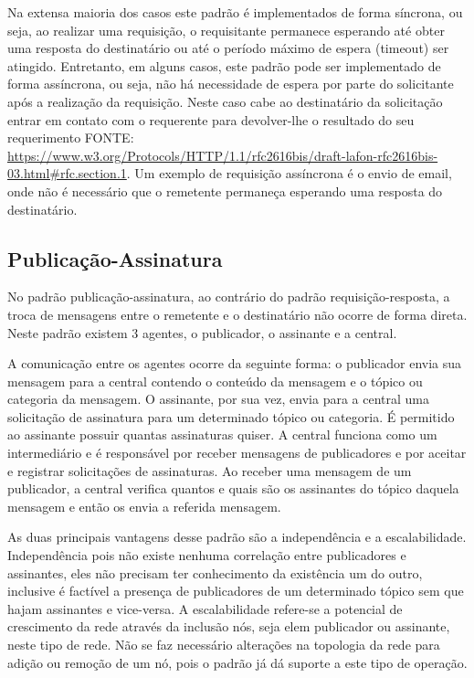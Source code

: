 Na extensa maioria dos casos este padrão é implementados de forma síncrona, ou seja, ao realizar uma requisição, o requisitante permanece esperando até obter uma resposta do destinatário ou até o período máximo de espera (timeout) ser atingido. Entretanto, em alguns casos, este padrão pode ser implementado de forma assíncrona, ou seja, não há necessidade de espera por parte do solicitante após a realização da requisição. Neste caso cabe ao destinatário da solicitação entrar em contato com o requerente para devolver-lhe o resultado do seu requerimento FONTE: \url{ https://www.w3.org/Protocols/HTTP/1.1/rfc2616bis/draft-lafon-rfc2616bis-03.html#rfc.section.1}. Um exemplo de requisição assíncrona é o envio de email, onde não é necessário que o remetente permaneça esperando uma resposta do destinatário.

\subsection{Publicação-Assinatura}

No padrão publicação-assinatura, ao contrário do padrão requisição-resposta, a troca de mensagens entre o remetente e o destinatário não ocorre de forma direta. Neste padrão existem 3 agentes, o publicador, o assinante e a central. 

A comunicação entre os agentes ocorre da seguinte forma: o publicador envia sua mensagem para a central contendo o conteúdo da mensagem e o tópico ou categoria da mensagem. O assinante, por sua vez, envia para a central uma solicitação de assinatura para um determinado tópico ou categoria. É permitido ao assinante possuir quantas assinaturas quiser. A central funciona como um intermediário e é responsável por receber mensagens de publicadores e por aceitar e registrar solicitações de assinaturas. Ao receber uma mensagem de um publicador, a central verifica quantos e quais são os assinantes do tópico daquela mensagem e então os envia a referida mensagem. 

As duas principais vantagens desse padrão são a independência e a escalabilidade. Independência pois não existe nenhuma correlação entre publicadores e assinantes, eles não precisam ter conhecimento da existência um do outro, inclusive é factível a presença de publicadores de um determinado tópico sem que hajam assinantes e vice-versa. A escalabilidade refere-se a potencial de crescimento da rede através da inclusão nós, seja elem publicador ou assinante, neste tipo de rede. Não se faz necessário alterações na topologia da rede para adição ou remoção de um nó, pois o padrão já dá suporte a este tipo de operação.

